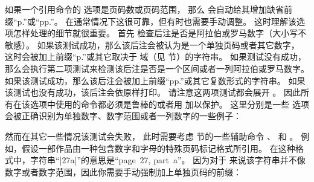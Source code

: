
如果一个引用命令的  选项是页码数或页码范围，
那么 \biblatex 会自动给其增加缺省前缀“p.”或“pp.”。
在通常情况下这很可靠，但有时也需要手动调整。
这时理解该选项怎样处理的细节就很重要。
首先 \biblatex 检查后注是否是阿拉伯或罗马数字（大小写不敏感）。
如果该测试成功，那么该后注会被认为是一个单独页码或者其它数字，
这时会被加上前缀“p.”或其它取决于  域（见  节）的字符串。
如果测试没有成功，那么会执行第二项测试来检测该后注是否是一个区间或者一列阿拉伯或罗马数字。
如果该测试成功，那么该后注会被加上前缀“pp.”或其它复数形式的字符串。
如果该测试也没有成功，该后注会依原样打印。
请注意这两项测试都会展开 。
因此所有在该选项中使用的命令都必须是鲁棒的或者用  加以保护。
这里分别是一些  选项会被正确识别为单独数字、数字范围或者一列数字的一些例子：

\begin{ltxexample}
\cite[25]{key}
\cite[vii]{key}
\cite[XIV]{key}
\cite[34--38]{key}
\cite[iv--x]{key}
\cite[185/86]{key}
\cite[XI \& XV]{key}
\cite[3, 5, 7]{key}
\cite[vii--x; 5, 7]{key}
\end{ltxexample}
%
然而在其它一些情况该测试会失败，
此时需要考虑  节的一些辅助命令 、 和 。
例如，假设一部作品由一种包含数字和字母的特殊页码标记格式所引用。
在这种格式中，字符串“|27a|”的意思是“page~27, part~a”。
因为对于 \biblatex 来说该字符串并不像数字或者数字范围，因此你需要手动强制加上单独页码的前缀：

